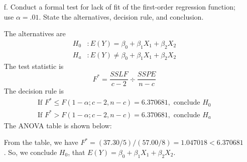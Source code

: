 \documentclass[10pt]{report}
\begin{document}
\begin{enumerate}
	\item [f.]
	Conduct a formal test for lack of fit of the first-order regression function; use $\alpha = .01$. State the alternatives, decision rule, and conclusion.
	
	The alternatives are
	\begin{align*}
		H_0 &: E(Y) = \beta_0 + \beta_1 X_1 + \beta_2 X_2 \\
		H_a &: E(Y) \ne \beta_0 + \beta_1 X_1 + \beta_2 X_2
	\end{align*}
	The test statistic is
	\[
	F^* = \frac{SSLF}{c-2} \div \frac{SSPE}{n-c}
	\]
	The decision rule is
	\begin{align*}
		\text{If } F^* \le F(1-\alpha; c-2, n-c) = 6.370681, \text{ conclude } H_0\\
		\text{If } F^* > F(1-\alpha; c-2, n-c) = 6.370681, \text{ conclude } H_a
	\end{align*}
	The ANOVA table is shown below:
	
	From the table, we have $F^* = (37.30/5)/(57.00/8) = 1.047018 < 6.370681$. So, we conclude $H_0$, that $E(Y) = \beta_0 + \beta_1 X_1 + \beta_2 X_2$.
	
\end{enumerate}
\end{document}

